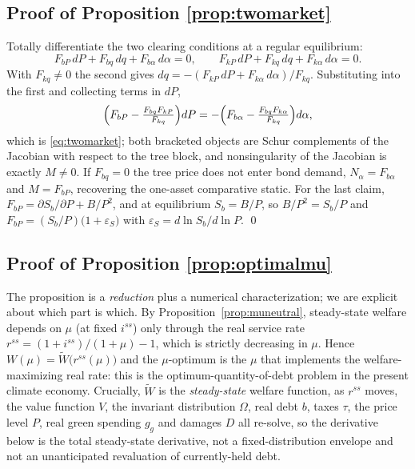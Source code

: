 \documentclass[12pt]{article}
\newcommand{\Sfun}{S}
\begin{document}
\subsection{Proof of Proposition \ref{prop:twomarket}}
Totally differentiate the two clearing conditions at a regular equilibrium:
\[
F_{bP}\,dP+F_{bq}\,dq+F_{b\alpha}\,d\alpha=0,
\qquad
F_{kP}\,dP+F_{kq}\,dq+F_{k\alpha}\,d\alpha=0 .
\]
With $F_{kq}\neq0$ the second gives
$dq=-(F_{kP}\,dP+F_{k\alpha}\,d\alpha)/F_{kq}$. Substituting into the first
and collecting terms in $dP$,
\[
\Bigl(F_{bP}-\tfrac{F_{bq}F_{kP}}{F_{kq}}\Bigr)dP
=-\Bigl(F_{b\alpha}-\tfrac{F_{bq}F_{k\alpha}}{F_{kq}}\Bigr)d\alpha ,
\]
which is \eqref{eq:twomarket}; both bracketed objects are Schur complements
of the Jacobian with respect to the tree block, and nonsingularity of the
Jacobian is exactly $M\neq0$. If $F_{bq}=0$ the tree price does not enter
bond demand, $N_\alpha=F_{b\alpha}$ and $M=F_{bP}$, recovering the one-asset
comparative static. For the last claim, $F_{bP}=\partial\Sfun_b/\partial
P+B/P^{2}$, and at equilibrium $\Sfun_b=B/P$, so $B/P^{2}=\Sfun_b/P$ and
$F_{bP}=(\Sfun_b/P)\bigl(1+\varepsilon_\Sfun\bigr)$ with
$\varepsilon_\Sfun=d\ln\Sfun_b/d\ln P$. \qed

\subsection{Proof of Proposition \ref{prop:optimalmu}}
The proposition is a \emph{reduction} plus a numerical characterization; we are
explicit about which part is which. By Proposition~\ref{prop:muneutral},
steady-state welfare depends on $\mu$ (at fixed $i^{ss}$) only through the
real service rate $r^{ss}=(1+i^{ss})/(1+\mu)-1$, which is strictly decreasing in
$\mu$. Hence $W(\mu)=\widetilde W\big(r^{ss}(\mu)\big)$ and the $\mu$-optimum is
the $\mu$ that implements the welfare-maximizing real rate: this is the
\citet{aiyagarimcgrattan1998} optimum-quantity-of-debt problem in the present
climate economy. Crucially, $\widetilde W$ is the \emph{steady-state} welfare
function, as $r^{ss}$ moves, the value function $V$, the invariant
distribution $\Omega$, real debt $b$, taxes $\tau$, the price level $P$, real
green spending $g_g$ and damages $D$ all re-solve, so the derivative below is
the total steady-state derivative, not a fixed-distribution envelope and
not an unanticipated revaluation of currently-held debt.
\end{document}
